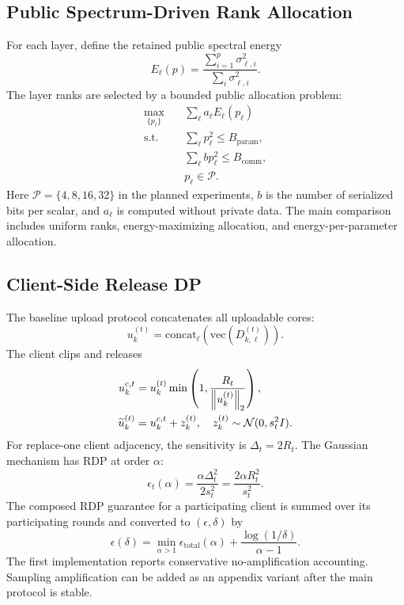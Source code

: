\subsection{Public Spectrum-Driven Rank Allocation}
For each layer, define the retained public spectral energy
\begin{equation}
  E_{\ell}(p)
  =
  \frac{\sum_{i=1}^{p}\sigma_{\ell,i}^{2}}
       {\sum_i\sigma_{\ell,i}^{2}}.
\end{equation}
The layer ranks are selected by a bounded public allocation problem:
\begin{align}
  \max_{\{p_{\ell}\}} \quad
  & \sum_{\ell} a_{\ell} E_{\ell}(p_{\ell}) \\
  \mathrm{s.t.}\quad
  & \sum_{\ell}p_{\ell}^{2}\le B_{\mathrm{param}}, \\
  & \sum_{\ell} b p_{\ell}^{2}\le B_{\mathrm{comm}}, \\
  & p_{\ell}\in \mathcal{P}.
\end{align}
Here $\mathcal{P}=\{4,8,16,32\}$ in the planned experiments, $b$ is the number of serialized bits per scalar, and $a_{\ell}$ is computed without private data. The main comparison includes uniform ranks, energy-maximizing allocation, and energy-per-parameter allocation.

\subsection{Client-Side Release DP}
The baseline upload protocol concatenates all uploadable cores:
\begin{equation}
  u_k^{(t)}=\mathrm{concat}_{\ell}\left(\mathrm{vec}(D_{k,\ell}^{(t)})\right).
\end{equation}
The client clips and releases
\begin{align}
  u_k^{c,t}
  &=
  u_k^{(t)}
  \min\left(1,\frac{R_t}{\left\lVert u_k^{(t)} \right\rVert_2}\right),\\
  \widetilde{u}_k^{(t)}
  &=
  u_k^{c,t}+z_k^{(t)},\quad
  z_k^{(t)}\sim\mathcal{N}(0,s_t^2I).
\end{align}
For replace-one client adjacency, the sensitivity is $\Delta_t=2R_t$. The Gaussian mechanism has RDP at order $\alpha$:
\begin{equation}
  \epsilon_t(\alpha)
  =
  \frac{\alpha \Delta_t^2}{2s_t^2}
  =
  \frac{2\alpha R_t^2}{s_t^2}.
\end{equation}
The composed RDP guarantee for a participating client is summed over its participating rounds and converted to $(\epsilon,\delta)$ by
\begin{equation}
  \epsilon(\delta)=
  \min_{\alpha>1}
  \epsilon_{\mathrm{total}}(\alpha)
  +\frac{\log(1/\delta)}{\alpha-1}.
\end{equation}
The first implementation reports conservative no-amplification accounting. Sampling amplification can be added as an appendix variant after the main protocol is stable.

